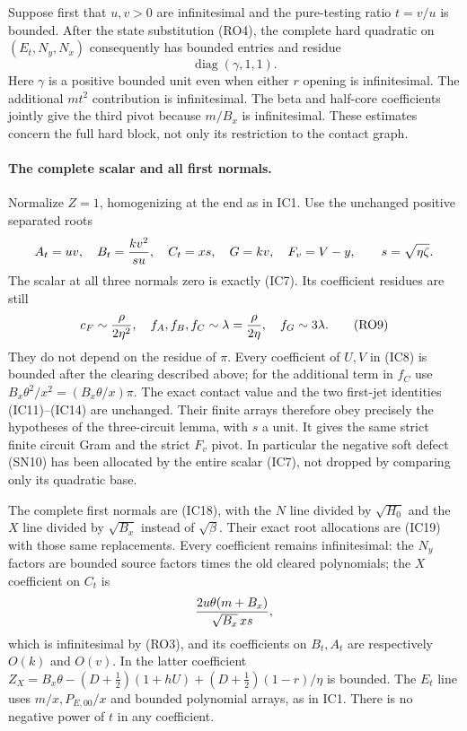Suppose first that $u,v>0$ are infinitesimal and the pure-testing
ratio $t=v/u$ is bounded. After the state substitution (RO4), the
complete hard quadratic on $(E_t,N_y,N_x)$ consequently has bounded
entries and residue
\[
                         \operatorname{diag}(\gamma,1,1).       \tag{RO8}
\]
Here $\gamma$ is a positive bounded unit even when either $r$
opening is infinitesimal. The additional $m t^2$ contribution is
infinitesimal. The beta and half-core coefficients jointly give the
third pivot because $m/B_x$ is infinitesimal. These estimates concern
the full hard block, not only its restriction to the contact graph.

\paragraph{The complete scalar and all first normals.}
Normalize $Z=1$, homogenizing at the end as in IC1. Use the unchanged
positive separated roots
\[
 A_t=uv,\quad B_t={kv^2\over s u},\quad C_t=xs,\quad
 G=kv,\quad F_v=V-y,\qquad s=\sqrt{\eta\zeta}.
\]
The scalar at all three normals zero is exactly (IC7). Its coefficient
residues are still
\[
 c_F\sim{\rho\over2\eta^2},\quad
 f_A,f_B,f_C\sim\lambda={\rho\over2\eta},\quad
 f_G\sim3\lambda.                                   \tag{RO9}
\]
They do not depend on the residue of $\pi$. Every coefficient of
$U,V$ in (IC8) is bounded after the clearing described above;
for the additional term in $f_C$ use
$B_x\theta^2/x^2=(B_x\theta/x)\pi$. The exact contact
value and the two first-jet identities (IC11)--(IC14) are unchanged.
Their finite arrays therefore obey precisely the hypotheses of the
three-circuit lemma, with $s$ a unit. It gives the same strict finite
circuit Gram and the strict $F_v$ pivot. In particular the negative
soft defect (SN10) has been allocated by the entire scalar (IC7), not
dropped by comparing only its quadratic base.

The complete first normals are (IC18), with the $N$ line divided
by $\sqrt{H_0}$ and the $X$ line divided by $\sqrt{B_x}$
instead of $\sqrt\beta$. Their exact root allocations are (IC19)
with those same replacements. Every coefficient remains infinitesimal:
the $N_y$ factors are bounded source factors times the old cleared
polynomials; the $X$ coefficient on $C_t$ is
\[
 {2u\theta(m+B_x)\over\sqrt{B_x}\,xs},
\]
which is infinitesimal by (RO3), and its coefficients on $B_t,A_t$
are respectively $O(k)$ and $O(v)$. In the latter coefficient
$Z_X=B_x\theta-(D+\tfrac12)(1+hU)
 +(D+\tfrac12)(1-r)/\eta$ is bounded. The $E_t$ line uses
$m/x,P_{E,00}/x$ and bounded polynomial arrays, as in IC1.
There is no negative power of $t$ in any coefficient.

